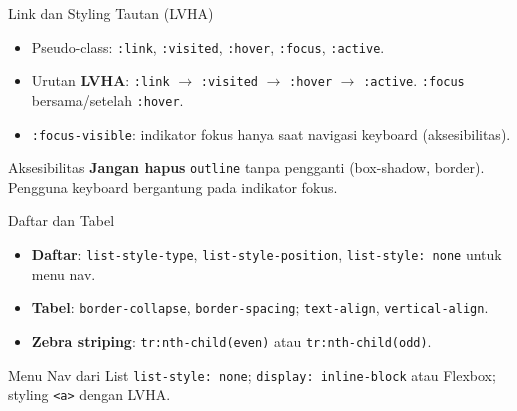 \documentclass[handout]{beamer}
\begin{document}
\begin{frame}{Link dan Styling Tautan (LVHA)}
	\begin{itemize}
		\item Pseudo-class: \texttt{:link}, \texttt{:visited}, \texttt{:hover}, \texttt{:focus}, \texttt{:active}.
		\item Urutan \textbf{LVHA}: \texttt{:link} $\to$ \texttt{:visited} $\to$ \texttt{:hover} $\to$ \texttt{:active}. \texttt{:focus} bersama/setelah \texttt{:hover}.
		\item \texttt{:focus-visible}: indikator fokus hanya saat navigasi keyboard (aksesibilitas).
	\end{itemize}
	\begin{block}{Aksesibilitas}
		\textbf{Jangan hapus} \texttt{outline} tanpa pengganti (box-shadow, border). Pengguna keyboard bergantung pada indikator fokus.
	\end{block}
\end{frame}

\begin{frame}{Daftar dan Tabel}
	\begin{itemize}
		\item \textbf{Daftar}: \texttt{list-style-type}, \texttt{list-style-position}, \texttt{list-style: none} untuk menu nav.
		\item \textbf{Tabel}: \texttt{border-collapse}, \texttt{border-spacing}; \texttt{text-align}, \texttt{vertical-align}.
		\item \textbf{Zebra striping}: \texttt{tr:nth-child(even)} atau \texttt{tr:nth-child(odd)}.
	\end{itemize}
	\begin{block}{Menu Nav dari List}
		\texttt{list-style: none}; \texttt{display: inline-block} atau Flexbox; styling \texttt{<a>} dengan LVHA.
	\end{block}
\end{frame}
\end{document}
